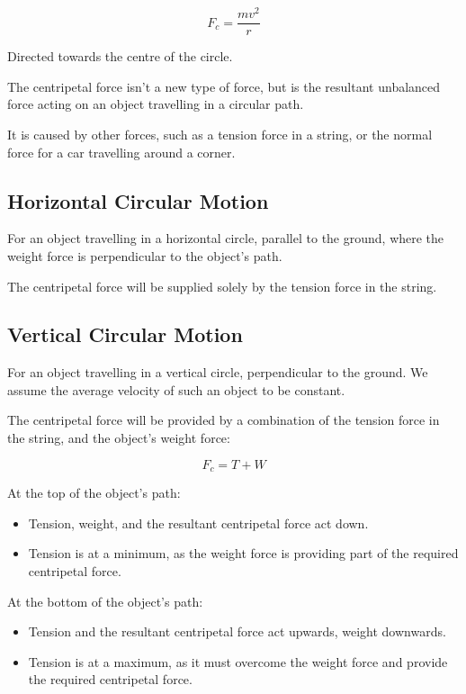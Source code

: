 \documentclass[a4paper,11pt]{article}
\begin{document}
$$
F_c = \frac{mv^2}{r}
$$

Directed towards the centre of the circle.

The centripetal force isn't a new type of force, but is the resultant unbalanced
force acting on an object travelling in a circular path.

It is caused by other forces, such as a tension force in a string, or the normal
force for a car travelling around a corner.


\subsection{Horizontal Circular Motion}

For an object travelling in a horizontal circle, parallel to the ground, where
the weight force is perpendicular to the object's path.

The centripetal force will be supplied solely by the tension force in the
string.


\subsection{Vertical Circular Motion}

For an object travelling in a vertical circle, perpendicular to the ground. We
assume the average velocity of such an object to be constant.

The centripetal force will be provided by a combination of the tension force
in the string, and the object's weight force:

$$
F_c = T + W
$$

At the top of the object's path:

\begin{itemize}
\item Tension, weight, and the resultant centripetal force act down.
\item Tension is at a minimum, as the weight force is providing part of the
	required centripetal force.
\end{itemize}

At the bottom of the object's path:

\begin{itemize}
\item Tension and the resultant centripetal force act upwards, weight downwards.
\item Tension is at a maximum, as it must overcome the weight force and provide
	the required centripetal force.
\end{itemize}
\end{document}
